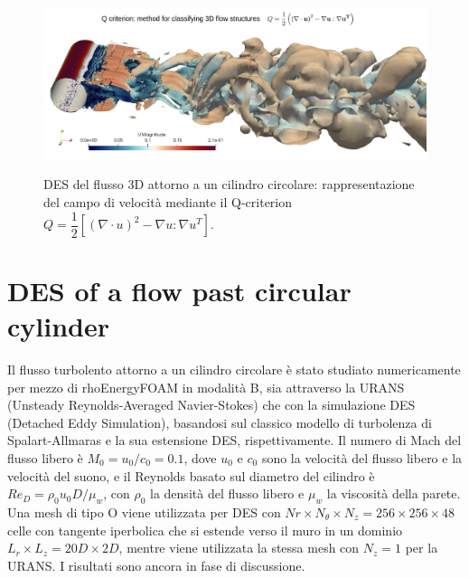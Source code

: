 \documentclass[a5paper]{sapthesis}
\begin{document}
	\begin{figure}[htp]
		\begin{center}
			{\includegraphics[width=0.98\linewidth]{Figures/Des_cylinder}}  
			\caption{DES del flusso 3D attorno a un cilindro circolare: rappresentazione del campo di velocità mediante il Q-criterion $Q = \dfrac{1}{2} [(\nabla \cdot u)^2 - \nabla u : \nabla u^T]$.}
			\label{Des_Cylinder}
		\end{center}
	\end{figure}
	
	
	\section{DES of a flow past circular cylinder}
	Il flusso turbolento attorno a un cilindro circolare è stato studiato numericamente per mezzo di rhoEnergyFOAM in modalità B, sia attraverso la URANS (Unsteady Reynolds-Averaged Navier-Stokes) che con la simulazione DES (Detached Eddy Simulation), basandosi sul classico modello di turbolenza di Spalart-Allmaras e la sua estensione DES, rispettivamente. Il numero di Mach del flusso libero è $M_0 = u_0 /c_0 = 0.1$, dove $u_0$ e $c_0$ sono la velocità del flusso libero e la velocità del suono, e il Reynolds basato sul diametro del cilindro è $Re_D = \rho_0 u_0 D/ \mu_w$, con $\rho_0$ la densità del flusso libero e $\mu_w$ la viscosità della parete. Una mesh di tipo O viene utilizzata per DES con $Nr \times N_\theta \times N_z = 256 \times 256 \times 48$ celle con tangente iperbolica che si estende verso il muro in un dominio $L_r \times L_z = 20D \times 2D$, mentre viene utilizzata la stessa mesh con $N_z = 1$ per la URANS. I risultati sono ancora in fase di discussione.
	
\end{document}
